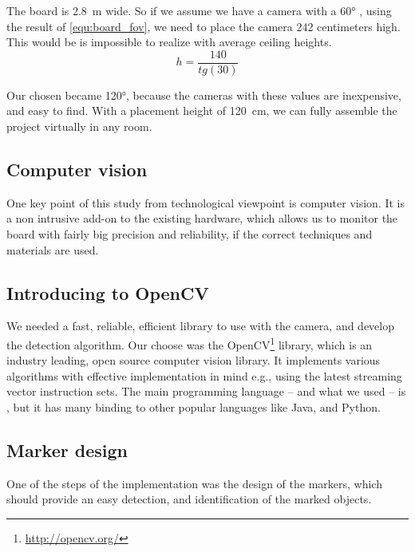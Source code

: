 \begin{example}
	The board is 2.8~\si{\meter} wide. So if we assume we have a camera with a \ang{60} , using the result of \cref{equ:board_fov}, we need to place the camera 242 centimeters high. This would be is impossible to realize with average ceiling heights.
	\begin{equation}
		\label{equ:board_fov}
		h = \frac{140}{tg(30)}
	\end{equation}
\end{example}

Our chosen  became \ang{120}, because the cameras with these  values are inexpensive, and easy to find. With a placement height of 120~\si{\centi\meter}, we can fully assemble the project virtually in any room.

\subsection{Computer vision}

One key point of this study from technological viewpoint is computer vision. It is a non intrusive add-on to the existing hardware, which allows us to monitor the board with fairly big precision and reliability, if the correct techniques and materials are used.

\subsection{Introducing to OpenCV}

We needed a fast, reliable, efficient library to use with the camera, and develop the detection algorithm. Our choose was the OpenCV\footnote{\url{http://opencv.org/}} library, which is an industry leading, open source computer vision library. It implements various algorithms with effective implementation in mind e.g., using the latest streaming vector instruction sets. The main programming language -- and what we used -- is , but it has many binding to other popular languages like Java, and Python.

\subsection{Marker design}

One of the steps of the  implementation was the design of the markers, which should provide an easy detection, and identification of the marked objects.

